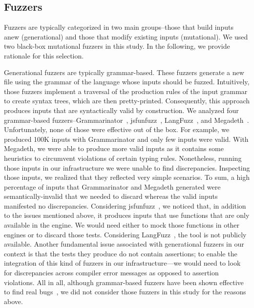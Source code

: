 \documentclass[sigconf,review, anonymous]{acmart}
\begin{document}
\subsection{Fuzzers}
\label{sec:objects:fuzzers}

Fuzzers are typically categorized in two main groups--those that build
inputs anew (generational) and those that modify existing inputs
(mutational). We used two black-box mutational
fuzzers
in this study. In the following, we provide rationale for this
selection.

Generational fuzzers are typically grammar-based. These fuzzers
generate a new file using the grammar of the language whose inputs
should be fuzzed. Intuitively, those fuzzers implement a traversal of
the production rules of the input grammar to create syntax trees,
which are then pretty-printed. Consequently, this approach produces
inputs that are syntactically valid by construction. We analyzed four
grammar-based fuzzers--Grammarinator~\cite{grammarinator},
jsfunfuzz~\cite{jsfunfuzz},
LangFuzz~\cite{Holler:2012:FCF:2362793.2362831}, and
Megadeth~\cite{grieco2016quickfuzz}.  Unfortunately, none of those
were effective out of the box. For example, we produced 100K inputs
with Grammarinator and only few inputs were valid. With Megadeth, we
were able to produce more valid inputs as it
contains some heuristics to circumvent violations of certain typing
rules.
Nonetheless, running those inputs in our infrastructure we were unable
to find discrepancies. Inspecting those inputs, we realized that they
reflected very simple scenarios. To sum, a high percentage of inputs
that Grammarinator and Megadeth generated were semantically-invalid
that we needed to discard whereas the valid inputs manifested no
discrepancies. Considering jsfunfuzz~\cite{jsfunfuzz}, we noticed
that, in addition to the issues mentioned above, it produces inputs
that use functions that are only available in the \smonkey{}
engine. We would need either to mock those functions in other engines
or to discard those tests. Considering
LangFuzz~\cite{Holler:2012:FCF:2362793.2362831}, the tool is not
publicly available. Another fundamental issue associated with
generational fuzzers in our context is that the tests they produce do
not contain assertions; to enable the integration of this kind of
fuzzers in our infrastructure---we would need to look for
discrepancies across compiler error messages as opposed to assertion
violations.  All in all, although grammar-based fuzzers have been
shown effective to find real
bugs~\cite{Holler:2012:FCF:2362793.2362831}, we did not consider those
fuzzers in this study for the reasons above.
\end{document}
